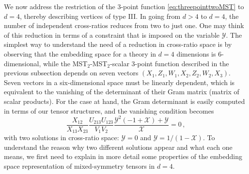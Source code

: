 \documentclass{article}
\begin{document}
We now address the restriction of the 3-point function
\eqref{eq:threepointtwoMST} to $d=4$, thereby describing vertices of type III. 
In going from $d>4$ to $d=4$, the number of independent cross-ratios reduces 
from two to just one. One may think of this reduction in terms of a constraint 
that is imposed on the variable $\mathcal{Y}$. The simplest way to understand 
the need of a reduction in cross-ratio space is by observing that the embedding 
space for a theory in $d=4$ dimensions is 6-dimensional, while the MST$_2$-MST$_2$-scalar
3-point function described in the previous subsection depends on seven vectors
$(X_1,Z_1,W_1,X_2,Z_2,W_2,X_3)$. Seven vectors in a six-dimensional space must be 
linearly dependent, which is equivalent to the vanishing of the determinant of their Gram matrix (matrix of scalar products). For the case at hand, the Gram determinant is easily computed in terms of our tensor structures,
and the vanishing condition becomes 
\begin{equation}
    \frac{X_{12}}{X_{13} X_{23}}\frac{ U_{213} U_{123}}{V_1 V_2}
    \frac{\mathcal{Y}^2(-1+\mathcal{X})+\mathcal{Y}}{\mathcal{X}}=0\,,
    \label{GramDeterminant}
\end{equation}
with two solutions in cross-ratio space: $\mathcal{Y}=0$ and
$\mathcal{Y}=1/(1-\mathcal{X})$. To understand the reason why two different
solutions appear and what each one means, we first need to explain in more detail some properties of the embedding space representation of mixed-symmetry 
tensors in $d=4$.
\end{document}
